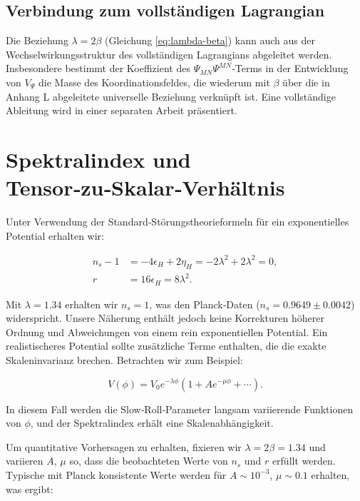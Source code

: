 \documentclass[12pt]{article}
\theoremstyle{remark}
\newcommand{\rs}{r}
\begin{document}
	\subsection{Verbindung zum vollständigen Lagrangian}
	
	Die Beziehung $\lambda = 2\beta$ (Gleichung \ref{eq:lambda-beta}) kann auch aus der Wechselwirkungsstruktur des vollständigen Lagrangians abgeleitet werden. Insbesondere bestimmt der Koeffizient des $\Psi_{MN}\Psi^{MN}$‑Terms in der Entwicklung von $V_{\Psi}$ die Masse des Koordinationsfeldes, die wiederum mit $\beta$ über die in Anhang L abgeleitete universelle Beziehung verknüpft ist. Eine vollständige Ableitung wird in einer separaten Arbeit präsentiert.
	
	\section{Spektralindex und Tensor‑zu‑Skalar‑Verhältnis}
	\label{sec:predictions}
	
	Unter Verwendung der Standard‑Störungstheorieformeln für ein exponentielles Potential erhalten wir:
	
	\begin{align}
		n_s - 1 &= -4\epsilon_H + 2\eta_H = -2\lambda^2 + 2\lambda^2 = 0, \\
		\rs &= 16\epsilon_H = 8\lambda^2.
	\end{align}
	
	Mit $\lambda = 1.34$ erhalten wir $n_s = 1$, was den Planck‑Daten ($n_s = 0.9649 \pm 0.0042$) widerspricht. Unsere Näherung enthält jedoch keine Korrekturen höherer Ordnung und Abweichungen von einem rein exponentiellen Potential. Ein realistischeres Potential sollte zusätzliche Terme enthalten, die die exakte Skaleninvarianz brechen. Betrachten wir zum Beispiel:
	
	\begin{equation}
		V(\phi) = V_0 e^{-\lambda \phi} \left(1 + A e^{-\mu \phi} + \cdots \right).
	\end{equation}
	
	In diesem Fall werden die Slow‑Roll‑Parameter langsam variierende Funktionen von $\phi$, und der Spektralindex erhält eine Skalenabhängigkeit.
	
	Um quantitative Vorhersagen zu erhalten, fixieren wir $\lambda = 2\beta = 1.34$ und variieren $A$, $\mu$ so, dass die beobachteten Werte von $n_s$ und $\rs$ erfüllt werden. Typische mit Planck konsistente Werte werden für $A \sim 10^{-3}$, $\mu \sim 0.1$ erhalten, was ergibt:
	
\end{document}
